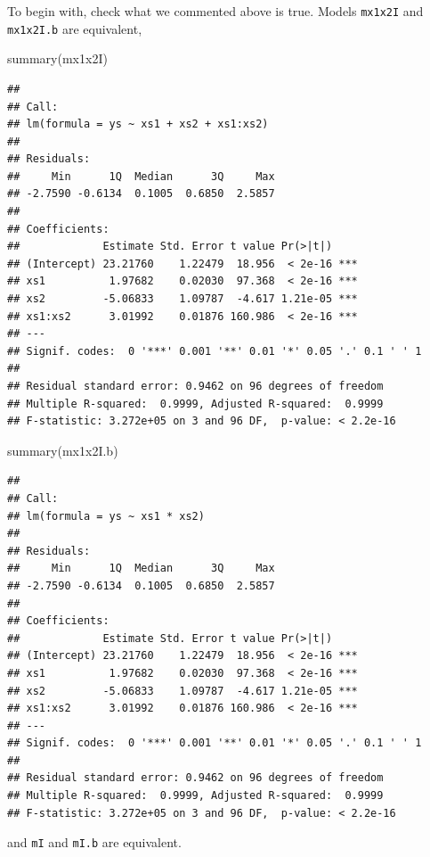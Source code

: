 \documentclass[
]{book}
\newenvironment{Shaded}{\begin{snugshade}}{\end{snugshade}}
\newcommand{\FunctionTok}[1]{\textcolor[rgb]{0.00,0.00,0.00}{#1}}
\newcommand{\NormalTok}[1]{#1}
\begin{document}
To begin with, check what we commented above is true. Models \texttt{mx1x2I} and \texttt{mx1x2I.b} are equivalent,

\begin{Shaded}
\begin{Highlighting}[]
\FunctionTok{summary}\NormalTok{(mx1x2I)}
\end{Highlighting}
\end{Shaded}

\begin{verbatim}
## 
## Call:
## lm(formula = ys ~ xs1 + xs2 + xs1:xs2)
## 
## Residuals:
##     Min      1Q  Median      3Q     Max 
## -2.7590 -0.6134  0.1005  0.6850  2.5857 
## 
## Coefficients:
##             Estimate Std. Error t value Pr(>|t|)    
## (Intercept) 23.21760    1.22479  18.956  < 2e-16 ***
## xs1          1.97682    0.02030  97.368  < 2e-16 ***
## xs2         -5.06833    1.09787  -4.617 1.21e-05 ***
## xs1:xs2      3.01992    0.01876 160.986  < 2e-16 ***
## ---
## Signif. codes:  0 '***' 0.001 '**' 0.01 '*' 0.05 '.' 0.1 ' ' 1
## 
## Residual standard error: 0.9462 on 96 degrees of freedom
## Multiple R-squared:  0.9999, Adjusted R-squared:  0.9999 
## F-statistic: 3.272e+05 on 3 and 96 DF,  p-value: < 2.2e-16
\end{verbatim}

\begin{Shaded}
\begin{Highlighting}[]
\FunctionTok{summary}\NormalTok{(mx1x2I.b)}
\end{Highlighting}
\end{Shaded}

\begin{verbatim}
## 
## Call:
## lm(formula = ys ~ xs1 * xs2)
## 
## Residuals:
##     Min      1Q  Median      3Q     Max 
## -2.7590 -0.6134  0.1005  0.6850  2.5857 
## 
## Coefficients:
##             Estimate Std. Error t value Pr(>|t|)    
## (Intercept) 23.21760    1.22479  18.956  < 2e-16 ***
## xs1          1.97682    0.02030  97.368  < 2e-16 ***
## xs2         -5.06833    1.09787  -4.617 1.21e-05 ***
## xs1:xs2      3.01992    0.01876 160.986  < 2e-16 ***
## ---
## Signif. codes:  0 '***' 0.001 '**' 0.01 '*' 0.05 '.' 0.1 ' ' 1
## 
## Residual standard error: 0.9462 on 96 degrees of freedom
## Multiple R-squared:  0.9999, Adjusted R-squared:  0.9999 
## F-statistic: 3.272e+05 on 3 and 96 DF,  p-value: < 2.2e-16
\end{verbatim}

and \texttt{mI} and \texttt{mI.b} are equivalent.
\end{document}
